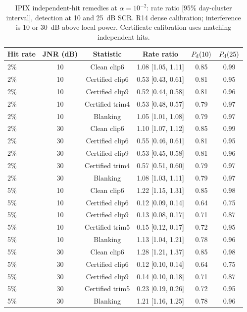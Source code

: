 \documentclass[10pt]{article}
\begin{document}
\begin{table}[htbp]
\centering\small\setlength{\tabcolsep}{4pt}
\caption{IPIX independent-hit remedies at $\alpha=10^{-2}$: rate ratio [95\% day-cluster interval], detection at 10 and 25~dB SCR. R14 dense calibration; interference is 10 or 30~dB above local power. Certificate calibration uses matching independent hits.}\label{tab:remedies_2}
\begin{tabular}{lccccc}
\toprule
Hit rate & JNR (dB) & Statistic & Rate ratio & $P_{\rm d}(10)$ & $P_{\rm d}(25)$ \\
\midrule
2\% & 10 & Clean clip6 & 1.08 [1.05, 1.11] & 0.85 & 0.99 \\
2\% & 10 & Certified clip6 & 0.53 [0.43, 0.61] & 0.81 & 0.95 \\
2\% & 10 & Certified clip9 & 0.52 [0.44, 0.58] & 0.81 & 0.96 \\
2\% & 10 & Certified trim4 & 0.53 [0.48, 0.57] & 0.79 & 0.97 \\
2\% & 10 & Blanking & 1.05 [1.01, 1.08] & 0.79 & 0.97 \\
2\% & 30 & Clean clip6 & 1.10 [1.07, 1.12] & 0.85 & 0.99 \\
2\% & 30 & Certified clip6 & 0.55 [0.46, 0.61] & 0.81 & 0.95 \\
2\% & 30 & Certified clip9 & 0.53 [0.45, 0.58] & 0.81 & 0.96 \\
2\% & 30 & Certified trim4 & 0.57 [0.51, 0.60] & 0.79 & 0.97 \\
2\% & 30 & Blanking & 1.08 [1.03, 1.11] & 0.79 & 0.97 \\
5\% & 10 & Clean clip6 & 1.22 [1.15, 1.31] & 0.85 & 0.98 \\
5\% & 10 & Certified clip6 & 0.12 [0.09, 0.14] & 0.64 & 0.75 \\
5\% & 10 & Certified clip9 & 0.13 [0.08, 0.17] & 0.71 & 0.87 \\
5\% & 10 & Certified trim5 & 0.15 [0.12, 0.17] & 0.72 & 0.95 \\
5\% & 10 & Blanking & 1.13 [1.04, 1.21] & 0.78 & 0.96 \\
5\% & 30 & Clean clip6 & 1.28 [1.21, 1.37] & 0.85 & 0.98 \\
5\% & 30 & Certified clip6 & 0.12 [0.10, 0.14] & 0.64 & 0.75 \\
5\% & 30 & Certified clip9 & 0.14 [0.10, 0.18] & 0.71 & 0.87 \\
5\% & 30 & Certified trim5 & 0.23 [0.19, 0.26] & 0.72 & 0.95 \\
5\% & 30 & Blanking & 1.21 [1.16, 1.25] & 0.78 & 0.96 \\
\bottomrule
\end{tabular}
\end{table}
\end{document}
